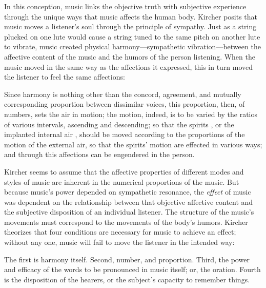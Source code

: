 In this conception, music links the objective truth with subjective experience
through the unique ways that music affects the human body.  
Kircher posits that music moves a listener's soul through the principle of
sympathy.%
    \Autocites
    {Gouk:Sciences}
    {Gouk:Harmonics}
Just as a string plucked on one lute would cause a string tuned to the same
pitch on another lute to vibrate, music created physical harmony---sympathetic
vibration---between the affective content of the music and the humors of the
person listening.
When the music moved in the same way as the affections it expressed, this in
turn moved the listener to feel the same affections:
\begin{quoting}
    Since harmony is nothing other than the concord, agreement, and mutually
    corresponding proportion between dissimilar voices, this proportion, then,
    of numbers, sets the air in motion; the motion, indeed, is to be varied by
    the ratios of various intervals, ascending and descending; so that the
    spirits , or the implanted internal air
     \Dots{}, should be moved according to the proportions
    of the motion of the external air, so that the spirits' motion are effected
    in various ways; and through this affections can be engendered in the
    person.%
        \Autocite[552]{Kircher:Musurgia}
\end{quoting}
Kircher seems to assume that the affective properties of different modes and
styles of music are inherent in the numerical proportions of the music. 
But because music's power depended on sympathetic resonance, the \emph{effect}
of music was dependent on the relationship between that objective affective
content and the subjective disposition of an individual listener.
The structure of the music's movements must correspond to the movements of the
body's humors.
Kircher theorizes that four conditions are necessary for music to achieve an
effect; without any one, music will fail to move the listener in the intended
way:
\begin{quoting}
    The first is harmony itself. Second, number, and proportion. Third, the
    power and efficacy of the words to be pronounced in music itself; or, the
    oration.
    Fourth is the disposition of the hearers, or the subject's capacity to
    remember things.%
        \Autocite[550]{Kircher:Musurgia}
\end{quoting}


